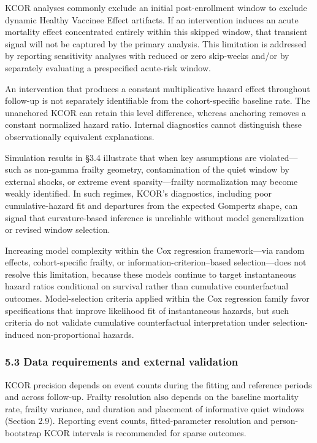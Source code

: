 \documentclass[
]{article}
\begin{document}
KCOR analyses commonly exclude an initial post-enrollment window to exclude dynamic Healthy Vaccinee Effect artifacts. If an intervention induces an acute mortality effect concentrated entirely within this skipped window, that transient signal will not be captured by the primary analysis. This limitation is addressed by reporting sensitivity analyses with reduced or zero skip-weeks and/or by separately evaluating a prespecified acute-risk window.

An intervention that produces a constant multiplicative hazard effect throughout follow-up is not separately identifiable from the cohort-specific baseline rate. The unanchored KCOR can retain this level difference, whereas anchoring removes a constant normalized hazard ratio. Internal diagnostics cannot distinguish these observationally equivalent explanations.

Simulation results in §3.4 illustrate that when key assumptions are violated---such as non-gamma frailty geometry, contamination of the quiet window by external shocks, or extreme event sparsity---frailty normalization may become weakly identified. In such regimes, KCOR's diagnostics, including poor cumulative-hazard fit and departures from the expected Gompertz shape, can signal that curvature-based inference is unreliable without model generalization or revised window selection.

Increasing model complexity within the Cox regression framework---via random effects, cohort-specific frailty, or information-criterion--based selection---does not resolve this limitation, because these models continue to target instantaneous hazard ratios conditional on survival rather than cumulative counterfactual outcomes. Model-selection criteria applied within the Cox regression family favor specifications that improve likelihood fit of instantaneous hazards, but such criteria do not validate cumulative counterfactual interpretation under selection-induced non-proportional hazards.

\subsubsection{5.3 Data requirements and external validation}\label{data-requirements-and-external-validation}

KCOR precision depends on event counts during the fitting and reference periods and across follow-up. Frailty resolution also depends on the baseline mortality rate, frailty variance, and duration and placement of informative quiet windows (Section 2.9). Reporting event counts, fitted-parameter resolution and person-bootstrap KCOR intervals is recommended for sparse outcomes.
\end{document}
